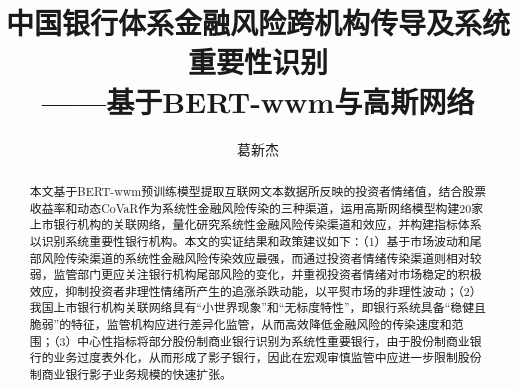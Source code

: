 \documentclass[lang=cn]{elegantpaper}
\title{\vspace{-2cm}中国银行体系金融风险跨机构传导及系统重要性识别\\{\large——基于BERT-wwm与高斯网络}}
\author{葛新杰}
\date{}
\begin{document}
\maketitle
\makeatletter
　　\def\@cite#1#2{\textsuperscript{[{#1\if@tempswa , #2\fi}]}}
\makeatother

\vspace{-1cm}
\begin{abstract}\vspace{-0.7cm}

本文基于BERT-wwm预训练模型提取互联网文本数据所反映的投资者情绪值，结合股票收益率和动态CoVaR作为系统性金融风险传染的三种渠道，运用高斯网络模型构建20家上市银行机构的关联网络，量化研究系统性金融风险传染渠道和效应，并构建指标体系以识别系统重要性银行机构。本文的实证结果和政策建议如下：（1）基于市场波动和尾部风险传染渠道的系统性金融风险传染效应最强，而通过投资者情绪传染渠道则相对较弱，监管部门更应关注银行机构尾部风险的变化，并重视投资者情绪对市场稳定的积极效应，抑制投资者非理性情绪所产生的追涨杀跌动能，以平熨市场的非理性波动；（2）我国上市银行机构关联网络具有“小世界现象”和“无标度特性”，即银行系统具备“稳健且脆弱”的特征，监管机构应进行差异化监管，从而高效降低金融风险的传染速度和范围；（3）中心性指标将部分股份制商业银行识别为系统性重要银行，由于股份制商业银行的业务过度表外化，从而形成了影子银行，因此在宏观审慎监管中应进一步限制股份制商业银行影子业务规模的快速扩张。
\end{abstract}

\end{document}
